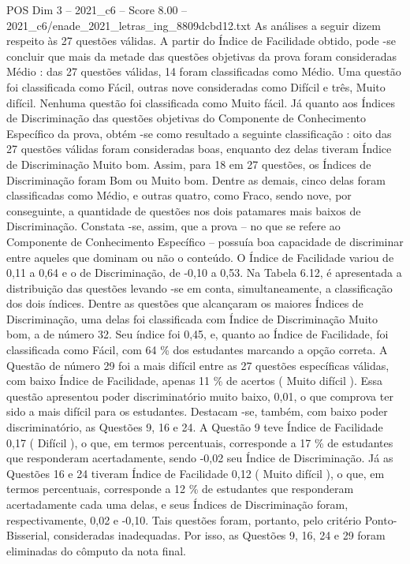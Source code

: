 \begin{textsample}{POS Dim 3 – 2021\_c6 – Score 8.00 – 2021\_c6/enade\_2021\_letras\_ing\_8809dcbd12.txt}
As análises a seguir dizem respeito às 27 questões válidas.
A partir do Índice de Facilidade obtido, pode -se concluir que mais da metade das questões objetivas da prova foram consideradas Médio : das 27 questões válidas, 14 foram classificadas como Médio.
Uma questão foi classificada como Fácil, outras nove consideradas como Difícil e três, Muito difícil.
Nenhuma questão foi classificada como Muito fácil.
Já quanto aos Índices de Discriminação das questões objetivas do Componente de Conhecimento Específico da prova, obtém -se como resultado a seguinte classificação : oito das 27 questões válidas foram consideradas boas, enquanto dez delas tiveram Índice de Discriminação Muito bom.
Assim, para 18 em 27 questões, os Índices de Discriminação foram Bom ou Muito bom.
Dentre as demais, cinco delas foram classificadas como Médio, e outras quatro, como Fraco, sendo nove, por conseguinte, a quantidade de questões nos dois patamares mais baixos de Discriminação.
Constata -se, assim, que a prova – no que se refere ao Componente de Conhecimento Específico – possuía boa capacidade de discriminar entre aqueles que dominam ou não o conteúdo.
O Índice de Facilidade variou de 0,11 a 0,64 e o de Discriminação, de -0,10 a 0,53.
Na Tabela 6.12, é apresentada a distribuição das questões levando -se em conta, simultaneamente, a classificação dos dois índices.
Dentre as questões que alcançaram os maiores Índices de Discriminação, uma delas foi classificada com Índice de Discriminação Muito bom, a de número 32.
Seu índice foi 0,45, e, quanto ao Índice de Facilidade, foi classificada como Fácil, com 64 \% dos estudantes marcando a opção correta.
A Questão de número 29 foi a mais difícil entre as 27 questões específicas válidas, com baixo Índice de Facilidade, apenas 11 \% de acertos ( Muito difícil ).
Essa questão apresentou poder discriminatório muito baixo, 0,01, o que comprova ter sido a mais difícil para os estudantes.
Destacam -se, também, com baixo poder discriminatório, as Questões 9, 16 e 24.
A Questão 9 teve Índice de Facilidade 0,17 ( Difícil ), o que, em termos percentuais, corresponde a 17 \% de estudantes que responderam acertadamente, sendo -0,02 seu Índice de Discriminação.
Já as Questões 16 e 24 tiveram Índice de Facilidade 0,12 ( Muito difícil ), o que, em termos percentuais, corresponde a 12 \% de estudantes que responderam acertadamente cada uma delas, e seus Índices de Discriminação foram, respectivamente, 0,02 e -0,10.
Tais questões foram, portanto, pelo critério Ponto-Bisserial, consideradas inadequadas.
Por isso, as Questões 9, 16, 24 e 29 foram eliminadas do cômputo da nota final.

\end{textsample}
